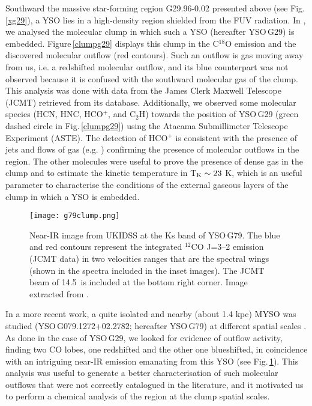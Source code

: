 \documentclass[baaa]{baaa}
\begin{document}
Southward the massive star-forming region G29.96-0.02 presented above (see Fig.\,\ref{xg29}), a YSO lies in a high-density region shielded from the FUV radiation. 
In \citet{areal20}, we analysed the molecular clump in which such a YSO (hereafter YSO\,G29) is embedded. Figure\,\ref{clumpg29} displays this clump in the C$^{18}$O emission and the discovered molecular outflow (red contours). Such an outflow is gas moving away from us, i.e. a redshifted molecular outflow, and its blue counterpart was not observed because it is confused with the southward molecular gas of the clump. This analysis was done with data from the James Clerk Maxwell Telescope (JCMT) retrieved from its database. Additionally, we observed some molecular species (HCN, HNC, HCO$^{+}$, and C$_{2}$H) towards the position of YSO\,G29 (green dashed circle in Fig.\,\ref{clumpg29}) using the Atacama Submillimeter Telescope Experiment (ASTE). The detection of HCO$^{+}$
is consistent with the presence of jets and flows of gas (e.g. \citealt{raw04,sanchez13}) confirming the presence of molecular outflows in the region. The other molecules were useful to
prove the presence of dense gas in the clump and to estimate the kinetic temperature in T$_{\rm K}\sim23$ K, which is an useful parameter
to characterise the conditions of the external gaseous layers of the clump in which a YSO is embedded. 

\begin{figure}[h]
\centering
\texttt{[image: g79clump.png]}
\caption{
Near-IR image from UKIDSS at the Ks band of YSO\,G79. The blue and red
contours represent the integrated $^{12}$CO J=3--2 emission (JCMT data) in two velocities
ranges that are the spectral wings (shown in the spectra included in the inset images). The JCMT beam of 14.5\arcsec~is included at the bottom right corner. Image extracted from \citet{paron22}.
}
\label{clumpg79}
\end{figure}

In a more recent work, a quite isolated and nearby (about 1.4 kpc) MYSO was studied (YSO\,G079.1272+02.2782; hereafter
YSO\,G79) at different spatial scales \citep{paron22}. As done in the case of YSO\,G29, we 
looked for evidence of outflow activity, finding two CO lobes, one redshifted and the other one
blueshifted, in coincidence with an intriguing near-IR emission emanating from this YSO (see Fig.\,\ref{clumpg79}). This analysis was useful to generate a better characterisation of such molecular outflows that were not correctly catalogued in the literature, and it motivated us to perform a chemical analysis of the region at the clump spatial scales. 
\end{document}

